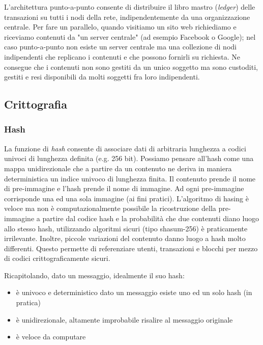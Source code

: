 \documentclass{book}
\theoremstyle{definition}
\begin{document}
L'architettura punto-a-punto consente di distribuire il libro mastro (\textit{ledger}) delle transazioni su tutti i nodi della rete,
indipendentemente da una organizzazione centrale. Per fare un parallelo, quando visitiamo un sito web richiediamo e riceviamo
contenuti da "un server centrale" (ad esempio Facebook o Google); nel caso punto-a-punto non esiste un server centrale
ma una collezione di nodi indipendenti che replicano i contenuti e che possono fornirli su richiesta.
Ne consegue che i contenuti non sono gestiti da un unico soggetto  ma sono custoditi, gestiti e resi disponibili da molti soggetti fra loro indipendenti.

\subsection{Crittografia}

\subsubsection{Hash}

La funzione di \textit{hash} consente di associare dati di arbitraria lunghezza a codici univoci di lunghezza definita (e.g. 256 bit).
Possiamo pensare all'hash come una mappa unidirezionale che a partire da un contenuto ne deriva in maniera deterministica un indice univoco di lunghezza finita.
Il contenuto prende il nome di pre-immagine e l'hash prende il nome di immagine. Ad ogni pre-immagine corrisponde una ed una sola immagine (ai fini pratici).
L'algoritmo di hasing è veloce ma non è computazionalmente possibile la ricostruzione della pre-immagine a partire dal codice hash e la probabilità che due
contenuti diano luogo allo stesso hash, utilizzando algoritmi sicuri (tipo shasum-256) è praticamente irrilevante.
Inoltre, piccole variazioni del contenuto danno luogo a hash molto differenti.
Questo permette di referenziare utenti, transazioni e blocchi per mezzo di codici crittograficamente sicuri.

Ricapitolando, dato un messaggio, idealmente il suo hash:

\begin{itemize}
    \item è univoco e deterministico dato un messaggio esiste uno ed un solo hash (in pratica)
    \item è unidirezionale, altamente improbabile risalire al messaggio originale
    \item è veloce da computare
\end{itemize}
\end{document}
